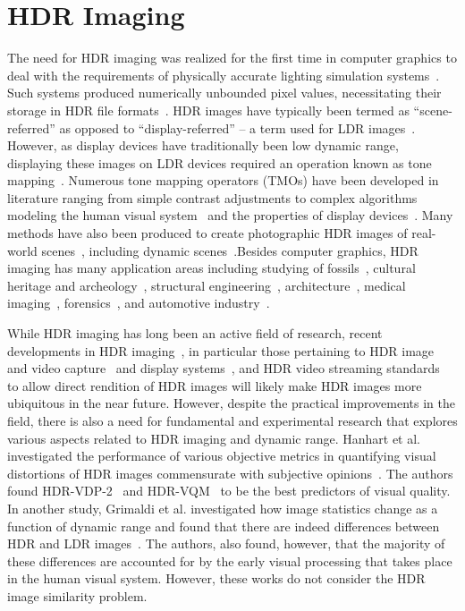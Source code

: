 \section{HDR Imaging}
The need for HDR imaging was realized for the first time in computer graphics to deal with the requirements of physically accurate lighting simulation systems~\cite{glassner1995principles}. Such systems produced numerically unbounded pixel values, necessitating their storage in HDR file formats~\cite{ward1998rendering}. HDR images have typically been termed as ``scene-referred'' as opposed to ``display-referred'' -- a term used for LDR images~\cite{Rein2010}. However, as display devices have traditionally been low dynamic range, displaying these images on LDR devices required an operation known as tone mapping~\cite{Tumb93,Ward97}. Numerous tone mapping operators (TMOs) have been developed in literature ranging from simple contrast adjustments to complex algorithms modeling the human visual system~\cite{Ferw96} and the properties of display devices~\cite{Mantiuk2008}. Many methods have also been produced to create photographic HDR images of real-world scenes~\cite{Debe97}, including dynamic scenes~\cite{sen2012robust,kalantari2017deep}.Besides computer graphics, HDR imaging has many application areas including studying of fossils~\cite{theodor2009high}, cultural heritage and archeology~\cite{happa2010high}, structural engineering~\cite{grinzato2009seismic}, architecture~\cite{cai2013high}, medical imaging~\cite{harifi2015efficient,rizzi2018visual}, forensics~\cite{brown2010forensic}, and automotive industry~\cite{wu2012fast}.

While HDR imaging has long been an active field of research, recent developments in HDR imaging~\cite{Rein2010,Banterle2011,chalmers2016high}, in particular those pertaining to HDR image and video capture~\cite{tocci2011versatile,froehlich2014creating} and display systems~\cite{seetzen2004high}, and HDR
video streaming standards~\cite{standard2016dynamic} to allow direct rendition of HDR images will likely make HDR images more ubiquitous in the near future. However, despite the practical improvements in the field, there is also a need for fundamental and experimental research that explores various aspects related to HDR imaging and dynamic range. Hanhart et al. investigated the performance of various objective metrics in quantifying visual distortions of HDR images commensurate with subjective opinions~\cite{hanhart2015benchmarking}. The authors found HDR-VDP-2~\cite{mantiuk2011hdr} and HDR-VQM~\cite{narwaria2015hdr} to be the best predictors of visual quality. In another study, Grimaldi et al. investigated how image statistics change as a function of dynamic range and found that there are indeed differences between HDR and LDR images~\cite{grimaldi2019statistics}. The authors, also found, however, that the majority of these differences are accounted for by the early visual processing that takes place in the human visual system. However, these works do not consider the HDR image similarity problem.

